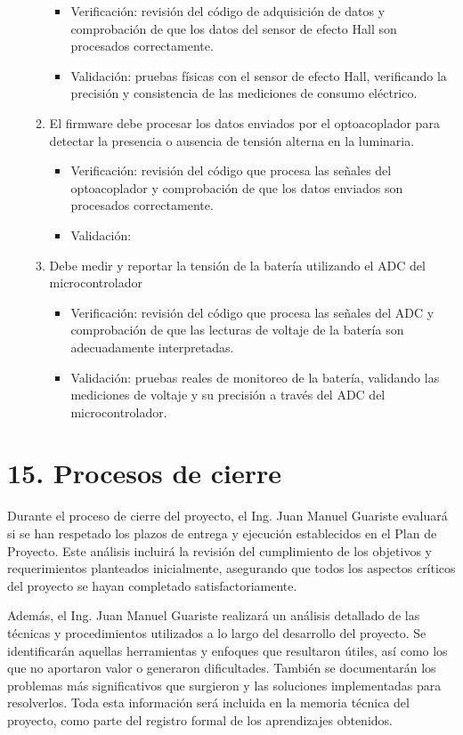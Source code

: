 \documentclass[
11pt, %
]{charter}
\begin{document}
\begin{enumerate}
\begin{enumerate}
\begin{itemize}
				\item Verificación: revisión del código de adquisición de datos y comprobación de que los datos del sensor de efecto Hall son procesados correctamente.
				\item Validación: pruebas físicas con el sensor de efecto Hall, verificando la precisión y consistencia de las mediciones de consumo eléctrico.
				\end{itemize}
			\item El firmware debe procesar los datos enviados por el optoacoplador para detectar la presencia o ausencia de tensión alterna en la luminaria.
				\begin{itemize}
				\item Verificación: revisión del código que procesa las señales del optoacoplador y comprobación de que los datos enviados son procesados correctamente.
				\item Validación:
				\end{itemize}
			\item Debe medir y reportar la tensión de la batería utilizando el ADC del microcontrolador
				\begin{itemize}
				\item Verificación: revisión del código que procesa las señales del ADC y comprobación de que las lecturas de voltaje de la batería son adecuadamente 	interpretadas.
				\item Validación: pruebas reales de monitoreo de la batería, validando las mediciones de voltaje y su precisión a través del ADC del microcontrolador.
				\end{itemize}
		\end{enumerate}
\end{enumerate}
\pagebreak
\section{15. Procesos de cierre}    
\label{sec:cierre}

Durante el proceso de cierre del proyecto, el Ing. Juan Manuel Guariste evaluará si se han respetado los plazos de entrega y ejecución establecidos en el Plan de Proyecto. Este análisis incluirá la revisión del cumplimiento de los objetivos y requerimientos planteados inicialmente, asegurando que todos los aspectos críticos del proyecto se hayan completado satisfactoriamente.

Además, el Ing. Juan Manuel Guariste realizará un análisis detallado de las técnicas y procedimientos utilizados a lo largo del desarrollo del proyecto. Se identificarán aquellas herramientas y enfoques que resultaron útiles, así como los que no aportaron valor o generaron dificultades. También se documentarán los problemas más significativos que surgieron y las soluciones implementadas para resolverlos. Toda esta información será incluida en la memoria técnica del proyecto, como parte del registro formal de los aprendizajes obtenidos.
\end{document}
